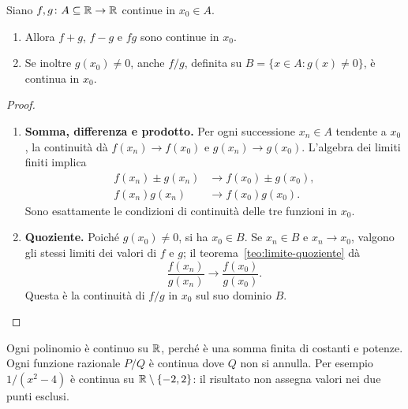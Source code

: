 \begin{teorema}
Siano $f,g\colon A\subseteq\mathbb{R}\to\mathbb{R}$ continue in $x_0\in A$. \begin{enumerate}[label=\arabic*.]
\item Allora $f+g$, $f-g$ e $fg$ sono continue in $x_0$.
\item Se inoltre $g(x_0)\ne0$, anche $f/g$, definita su $B=\{x\in A:g(x)\ne0\}$, è continua in $x_0$.
\end{enumerate}
\end{teorema}
\begin{proof}
\begin{enumerate}[label=\arabic*.]
\item \textbf{Somma, differenza e prodotto.} Per ogni successione $x_n\in A$ tendente a $x_0$, la continuità dà $f(x_n)\to f(x_0)$ e $g(x_n)\to g(x_0)$. L'algebra dei limiti finiti implica
\[
\begin{aligned}
f(x_n)\pm g(x_n)&\longrightarrow f(x_0)\pm g(x_0),\\
f(x_n)g(x_n)&\longrightarrow f(x_0)g(x_0).
\end{aligned}
\]
Sono esattamente le condizioni di continuità delle tre funzioni in $x_0$.
\item \textbf{Quoziente.} Poiché $g(x_0)\ne0$, si ha $x_0\in B$. Se $x_n\in B$ e $x_n\to x_0$, valgono gli stessi limiti dei valori di $f$ e $g$; il teorema~\ref{teo:limite-quoziente} dà
\[
\frac{f(x_n)}{g(x_n)}\longrightarrow\frac{f(x_0)}{g(x_0)}.
\]
Questa è la continuità di $f/g$ in $x_0$ sul suo dominio $B$.
\end{enumerate}
\end{proof}

\begin{esempio}
Ogni polinomio è continuo su $\mathbb{R}$, perché è una somma finita di costanti e potenze. Ogni funzione razionale $P/Q$ è continua dove $Q$ non si annulla. Per esempio $1/(x^2-4)$ è continua su $\mathbb{R}\setminus\{-2,2\}$: il risultato non assegna valori nei due punti esclusi.
\end{esempio}


